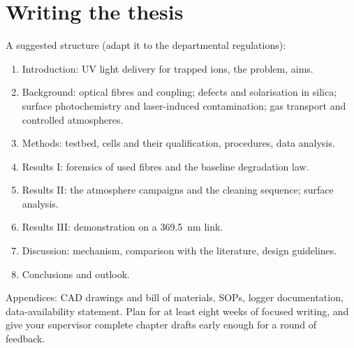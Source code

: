 \section{Writing the thesis}
A suggested structure (adapt it to the departmental regulations):
\begin{enumerate}
  \item Introduction: UV light delivery for trapped ions, the problem, aims.
  \item Background: optical fibres and coupling; defects and solarisation in silica; surface
        photochemistry and laser-induced contamination; gas transport and controlled atmospheres.
  \item Methods: testbed, cells and their qualification, procedures, data analysis.
  \item Results I: forensics of used fibres and the baseline degradation law.
  \item Results II: the atmosphere campaigns and the cleaning sequence; surface analysis.
  \item Results III: demonstration on a \SI{369.5}{nm} link.
  \item Discussion: mechanism, comparison with the literature, design guidelines.
  \item Conclusions and outlook.
\end{enumerate}
Appendices: CAD drawings and bill of materials, SOPs, logger documentation, data-availability statement.
Plan for at least eight weeks of focused writing, and give your supervisor complete chapter drafts
early enough for a round of feedback.
